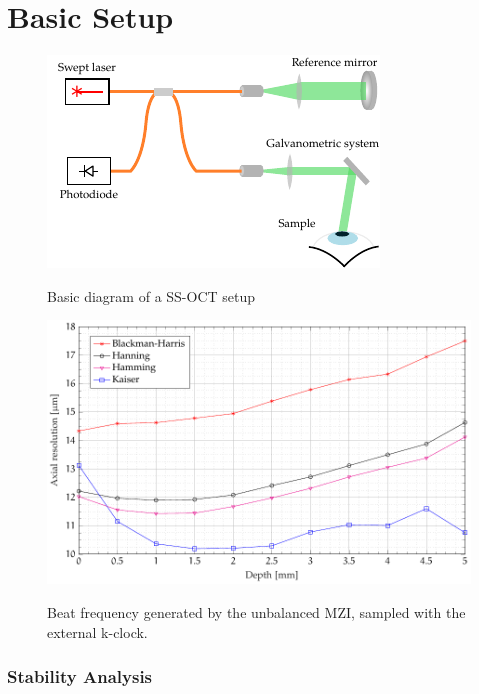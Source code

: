 \section{Basic Setup}
\begin{figure}[bth]
\myfloatalign
{\includegraphics[width=0.8\linewidth]{gfx/setup-diagrams/basic-oct.pdf}}
\caption{Basic diagram of a  SS-OCT setup}\label{fig:basic-oct}
\end{figure}



\begin{figure}[hbt]
{\myfloatalign
\includegraphics[width=\linewidth]{gfx/ch3/risoluzione-profondita}}
\caption{Beat frequency generated by the unbalanced \ac{MZI}, sampled with the external k-clock.}\label{fig:mzi-external}
\end{figure}


\subsubsection{Stability Analysis}


